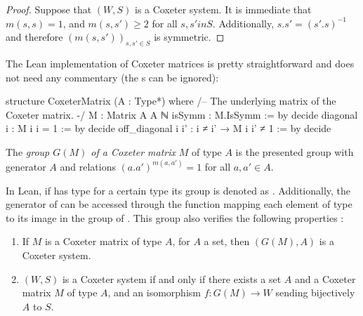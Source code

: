 \begin{proof}
    Suppose that $\left( W,S \right)$ is a Coxeter system. It is immediate that $m\left( s,s \right) = 1$, and $m(s,s') \ge  2$ for all $s,s' in S$. Additionally, $s.s' = (s'.s)^{-1}$ and therefore $\left( m\left( s,s' \right) \right)_{s,s' \in  S}$ is symmetric.
\end{proof}

The Lean implementation of Coxeter matrices is pretty straightforward and does not need any commentary (the s can be ignored):
\begin{leancode}
structure CoxeterMatrix (A : Type*) where
  /-- The underlying matrix of the Coxeter matrix. -/
  M : Matrix A A ℕ
  isSymm : M.IsSymm := by decide
  diagonal i : M i i = 1 := by decide
  off_diagonal i i' : i ≠ i' → M i i' ≠ 1 := by decide
\end{leancode}

\begin{definition}
    The \emph{group  $G(M)$ of a Coxeter matrix} $M$ of type $A$ is the presented group with generator $A$ and relations $(a.a')^{m\left( a,a' \right)} = 1$ for all $a,a' \in A$. 
\end{definition}

In Lean, if  has type  for a certain type  its group is denoted as . Additionally, the generator of  can be accessed through the function  mapping each element of type \lean{\B} to its image in the group of . This group also verifies the following properties :

\begin{propriete}

\begin{enumerate}
    \item If $M$ is a Coxeter matrix of type $A$, for $A$ a set, then $\left( G\left( M \right),A \right)$ is a Coxeter system.
    \item $\left( W,S \right)$ is a Coxeter system if and only if there exists a set $A$ and a Coxeter matrix $M$ of type $A$, and an isomorphism $f : G\left( M \right) \to W$ sending bijectively $A$ to $S$. 
\end{enumerate}
\end{propriete}
   
